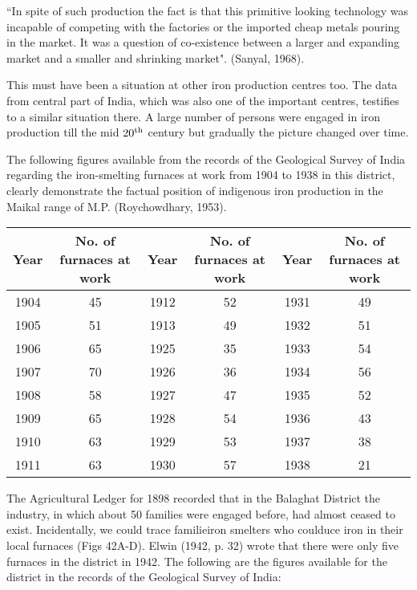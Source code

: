 \footnotesize{“In spite of such production the fact is that this primitive looking technology was incapable of competing with the factories or the imported cheap metals pouring in the market.  It was a question of co-existence between a larger and expanding market and a smaller and shrinking market".} (Sanyal, 1968). 

This must have been a situation at other iron production centres too.  The data from central part of India, which was also one of the important centres, testifies to a similar situation there. A large number of persons were engaged in iron production till the mid $20^{\rm th}$ century but gradually the picture changed over time.

The following figures available from the records of the Geological Survey of India regarding the iron-smelting furnaces at work from 1904 to 1938 in this district, clearly demonstrate the factual position of indigenous iron production in the Maikal range of M.P. (Roychowdhary, 1953).

{\fontsize{7}{9}\selectfont\begin{longtable}{|c|c|c|c|c|c|}
\hline
\multicolumn{1}{|m{.5cm}|}{\textbf{Year}} & \multicolumn{1}{m{1.5cm}|}{\centering \textbf{No. of furnaces at work}} & 
\multicolumn{1}{m{.5cm}|}{\textbf{Year}} & \multicolumn{1}{m{1.5cm}|}{\centering \textbf{No. of furnaces at work}} & 
\multicolumn{1}{m{.5cm}|}{\textbf{Year}} & \multicolumn{1}{m{1.5cm}|}{\centering \textbf{No. of furnaces at work}}\\
\hline
1904 & 45 & 1912 & 52 & 1931 & 49\\
1905 & 51 & 1913 & 49 & 1932 & 51\\
1906 & 65 & 1925 & 35 & 1933 & 54\\
1907 & 70 & 1926 & 36 & 1934 & 56\\
1908 & 58 & 1927 & 47 & 1935 & 52\\
1909 & 65 & 1928 & 54 & 1936 & 43\\
1910 & 63 & 1929 & 53 & 1937 & 38\\
1911 & 63 & 1930 & 57 & 1938 & 21\\
\hline
\end{longtable}}

The Agricultural Ledger for 1898 recorded that in the Balaghat District the industry, in which about 50 families were engaged before, had almost ceased to exist. Incidentally, we could trace familieiron smelters who coulduce iron in their local furnaces (Figs 42A-D). Elwin (1942, p. 32) wrote that there were only five furnaces in the district in 1942.  The following are the figures available for the district in the records of the Geological Survey of India:

